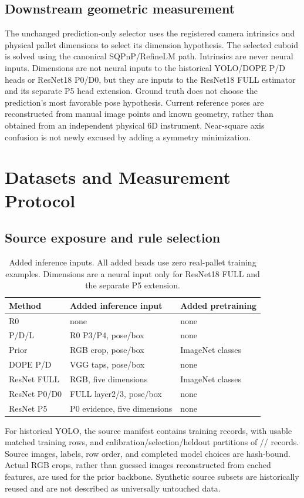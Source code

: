 \documentclass[journal]{IEEEtran}
\begin{document}
\subsection{Downstream geometric measurement}
The unchanged prediction-only selector uses the registered camera intrinsics and physical pallet dimensions to select its dimension hypothesis. The selected cuboid is solved using the canonical SQPnP/RefineLM path. Intrinsics are never neural inputs. Dimensions are not neural inputs to the historical YOLO/DOPE P/D heads or ResNet18 P0/D0, but they are inputs to the ResNet18 FULL estimator and its separate P5 head extension. Ground truth does not choose the prediction's most favorable pose hypothesis. Current reference poses are reconstructed from manual image points and known geometry, rather than obtained from an independent physical 6D instrument. Near-square axis confusion is not newly excused by adding a symmetry minimization.

\section{Datasets and Measurement Protocol}
\subsection{Source exposure and rule selection}
\begin{table}[t]\centering\caption{Added inference inputs. All added heads use zero real-pallet training examples. Dimensions are a neural input only for ResNet18 FULL and the separate P5 extension.}\label{tab:inputs}
\scriptsize\setlength{\tabcolsep}{2pt}\begin{tabular}{p{}p{}p{}}\toprule Method & Added inference input & Added pretraining\\\midrule
R0 & none & none\\
P/D/L & R0 P3/P4, pose/box & none\\
Prior & RGB crop, pose/box & ImageNet classes\\
DOPE P/D & VGG taps, pose/box & none\\
ResNet FULL & RGB, five dimensions & ImageNet classes\\
ResNet P0/D0 & FULL layer2/3, pose/box & none\\
ResNet P5 & P0 evidence, five dimensions & none\\\bottomrule\end{tabular}\end{table}
For historical YOLO, the source manifest contains \TrainN{} training records, with \UsableTrainN{} usable matched training rows, and calibration/selection/heldout partitions of \CalN{}/\SelectionN{}/\HeldoutN{} records. Source images, labels, row order, and completed model choices are hash-bound. Actual RGB crops, rather than guessed images reconstructed from cached features, are used for the prior backbone. Synthetic source subsets are historically reused and are not described as universally untouched data.
\end{document}
